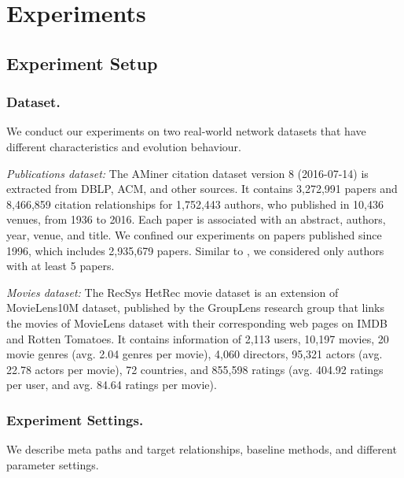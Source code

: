 \section{Experiments}



\subsection{Experiment Setup}

\subsubsection{Dataset.} We conduct our experiments on two real-world network datasets that have different characteristics and evolution behaviour. 

\textit{Publications dataset:} The AMiner citation dataset \cite{Tang:08KDD} version 8 (2016-07-14) is extracted from DBLP, ACM, and other sources. It contains 3,272,991 papers and 8,466,859 citation relationships for 1,752,443 authors, who published in 10,436 venues, from 1936 to 2016. Each paper is associated with an abstract, authors, year, venue, and title. We confined our experiments on papers published since 1996, which includes 2,935,679 papers. Similar to \cite{sun2011ASONAM}, we considered only authors with at least 5 papers.
    
\textit{Movies dataset:} The RecSys HetRec movie dataset \cite{Cantador:RecSys2011} is an extension of MovieLens10M dataset, published by the GroupLens research group that links the movies of MovieLens dataset with their corresponding web pages on IMDB and Rotten Tomatoes. It contains information of 2,113 users, 10,197 movies, 20 movie genres (avg. 2.04 genres per movie), 4,060 directors, 95,321 actors (avg. 22.78 actors per movie), 72 countries, and 855,598 ratings (avg. 404.92 ratings per user, and avg. 84.64 ratings per movie).%


\subsubsection{Experiment Settings.} We describe meta paths and target relationships, baseline methods, and different parameter settings.

